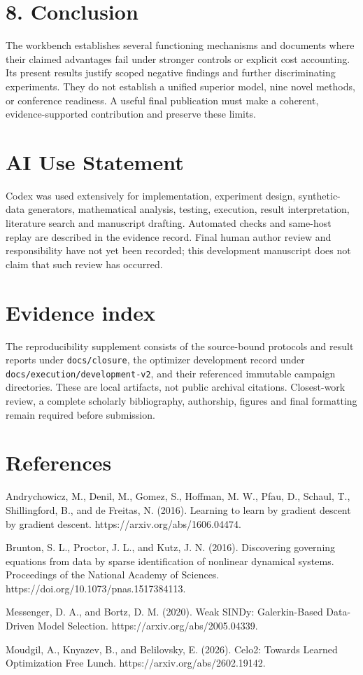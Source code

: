 \documentclass[
]{article}
\begin{document}
\section{8. Conclusion}\label{conclusion}

The workbench establishes several functioning mechanisms and documents
where their claimed advantages fail under stronger controls or explicit
cost accounting. Its present results justify scoped negative findings
and further discriminating experiments. They do not establish a unified
superior model, nine novel methods, or conference readiness. A useful
final publication must make a coherent, evidence-supported contribution
and preserve these limits.

\section{AI Use Statement}\label{ai-use-statement}

Codex was used extensively for implementation, experiment design,
synthetic-data generators, mathematical analysis, testing, execution,
result interpretation, literature search and manuscript drafting.
Automated checks and same-host replay are described in the evidence
record. Final human author review and responsibility have not yet been
recorded; this development manuscript does not claim that such review
has occurred.

\section{Evidence index}\label{evidence-index}

The reproducibility supplement consists of the source-bound protocols
and result reports under \texttt{docs/closure}, the optimizer
development record under \texttt{docs/execution/development-v2}, and
their referenced immutable campaign directories. These are local
artifacts, not public archival citations. Closest-work review, a
complete scholarly bibliography, authorship, figures and final
formatting remain required before submission.

\section{References}\label{references}

Andrychowicz, M., Denil, M., Gomez, S., Hoffman, M. W., Pfau, D.,
Schaul, T., Shillingford, B., and de Freitas, N. (2016). Learning to
learn by gradient descent by gradient descent.
https://arxiv.org/abs/1606.04474.

Brunton, S. L., Proctor, J. L., and Kutz, J. N. (2016). Discovering
governing equations from data by sparse identification of nonlinear
dynamical systems. Proceedings of the National Academy of Sciences.
https://doi.org/10.1073/pnas.1517384113.

Messenger, D. A., and Bortz, D. M. (2020). Weak SINDy: Galerkin-Based
Data-Driven Model Selection. https://arxiv.org/abs/2005.04339.

Moudgil, A., Knyazev, B., and Belilovsky, E. (2026). Celo2: Towards
Learned Optimization Free Lunch. https://arxiv.org/abs/2602.19142.
\end{document}
